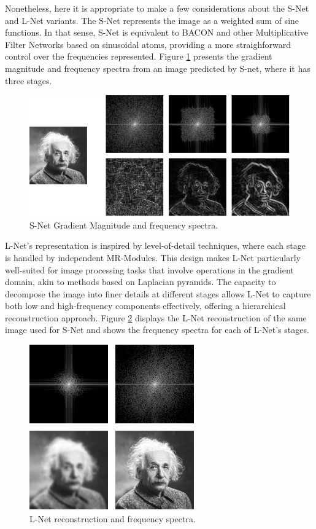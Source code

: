 Nonetheless, here it is appropriate to make a few considerations about the S-Net and L-Net variants. The S-Net represents the image as a weighted sum of sine functions. In that sense, S-Net is equivalent to BACON and other Multiplicative Filter Networks based on sinusoidal atoms, providing a more straighforward control over the frequencies represented. Figure \ref{f:albert-snet} presents the gradient magnitude and frequency spectra from an image predicted by S-net, where it has three stages.


\begin{figure}[!h]
\centering
\includegraphics[width=0.8\linewidth]{img/ch5/albert.png}
\caption{S-Net Gradient Magnitude and frequency spectra.}
\label{f:albert-snet}
\end{figure}


L-Net's representation is inspired by level-of-detail techniques, where each stage is handled by independent MR-Modules. This design makes L-Net particularly well-suited for image processing tasks that involve operations in the gradient domain, akin to methods based on Laplacian pyramids. The capacity to decompose the image into finer details at different stages allows L-Net to capture both low and high-frequency components effectively, offering a hierarchical reconstruction approach. Figure \ref{f:albert-lnet} displays the L-Net reconstruction of the same image used for S-Net and shows the frequency spectra for each of L-Net's stages.

\begin{figure}[!h]
\centering
\includegraphics[width=0.80\linewidth]{img/ch5/albert-lnet.png}
\caption{L-Net reconstruction and frequency spectra.}
\label{f:albert-lnet}
\end{figure}



